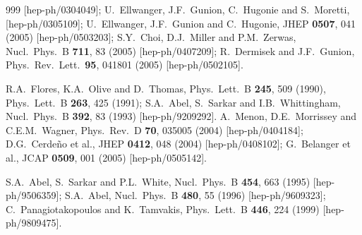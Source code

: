 \documentclass[12pt]{article}
\begin{document}
\begin{thebibliography}{999}
  [hep-ph/0304049];
U.~Ellwanger, J.F.~Gunion, C.~Hugonie and S.~Moretti,
  [hep-ph/0305109];
U.~Ellwanger, J.F.~Gunion and C.~Hugonie,
  JHEP {\bf 0507}, 041 (2005)
  [hep-ph/0503203];
S.Y.~Choi, D.J.~Miller and P.M.~Zerwas,
  Nucl.\ Phys.\ B {\bf 711}, 83 (2005)
  [hep-ph/0407209];
R.~Dermisek and J.F.~Gunion,
  Phys.\ Rev.\ Lett.\  {\bf 95}, 041801 (2005)
  [hep-ph/0502105].

R.A.~Flores, K.A.~Olive and D.~Thomas,
  Phys.\ Lett.\ B {\bf 245}, 509 (1990),
  Phys.\ Lett.\ B {\bf 263}, 425 (1991);
S.A.~Abel, S.~Sarkar and I.B.~Whittingham, 
  Nucl.\ Phys.\ B {\bf 392}, 83 (1993)
  [hep-ph/9209292].
A.~Menon, D.E.~Morrissey and C.E.M.~Wagner,
  Phys.\ Rev.\ D {\bf 70}, 035005 (2004)
  [hep-ph/0404184];
D.G.~Cerde\~no et al.,
  JHEP {\bf 0412}, 048 (2004)
  [hep-ph/0408102];
G.~Belanger et al., 
  JCAP {\bf 0509}, 001 (2005)
  [hep-ph/0505142].

S.A.~Abel, S.~Sarkar and P.L.~White,
  Nucl.\ Phys.\ B {\bf 454}, 663 (1995)
  [hep-ph/9506359];
S.A.~Abel,
  Nucl.\ Phys.\ B {\bf 480}, 55 (1996)
  [hep-ph/9609323];
C.~Panagiotakopoulos and K.~Tamvakis,
  Phys.\ Lett.\ B {\bf 446}, 224 (1999)
  [hep-ph/9809475].
    

\end{thebibliography}
\end{document}
